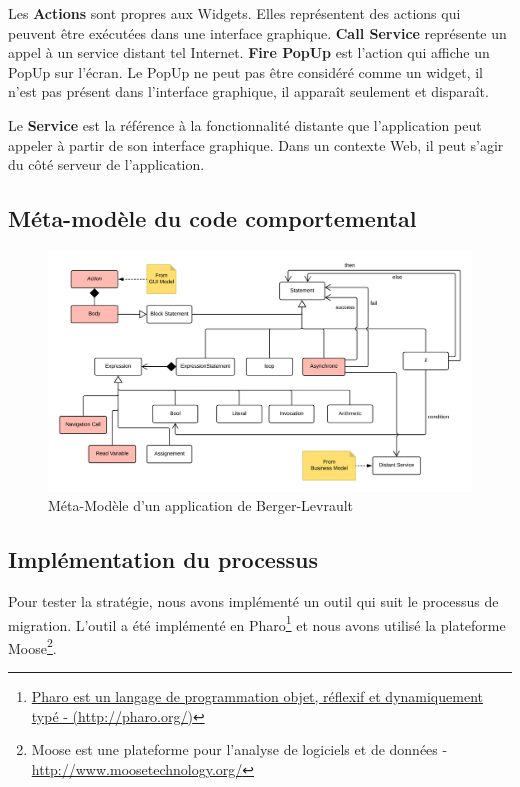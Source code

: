 \documentclass[11pt,]{article}
\begin{document}
Les \textbf{Actions} sont propres aux Widgets. Elles représentent des
actions qui peuvent être exécutées dans une interface graphique.
\textbf{Call Service} représente un appel à un service distant tel
Internet. \textbf{Fire PopUp} est l'action qui affiche un PopUp sur
l'écran. Le PopUp ne peut pas être considéré comme un widget, il n'est
pas présent dans l'interface graphique, il apparaît seulement et
disparaît.

Le \textbf{Service} est la référence à la fonctionnalité distante que
l'application peut appeler à partir de son interface graphique. Dans un
contexte Web, il peut s'agir du côté serveur de l'application.

\hypertarget{muxe9ta-moduxe8le-du-code-comportemental}{%
\subsection{Méta-modèle du code
comportemental}\label{muxe9ta-moduxe8le-du-code-comportemental}}

\hypertarget{behavioralModel}{%
\begin{figure}
\centering
\includegraphics[width=1\textwidth,height=\textheight]{figures/behavioralModel.png}
\caption{Méta-Modèle d'un application de
Berger-Levrault}\label{behavioralModel}
\end{figure}
}

\hypertarget{impluxe9mentation-du-processus}{%
\subsection{Implémentation du
processus}\label{impluxe9mentation-du-processus}}

Pour tester la stratégie, nous avons implémenté un outil qui suit le
processus de migration. L'outil a été implémenté en Pharo\footnote{\href{http://pharo.org/}{Pharo
  est un langage de programmation objet, réflexif et dynamiquement typé
  - (http://pharo.org/)}} et nous avons utilisé la plateforme
Moose\footnote{Moose est une plateforme pour l'analyse de logiciels et
  de données - \url{http://www.moosetechnology.org/}}.
\end{document}
